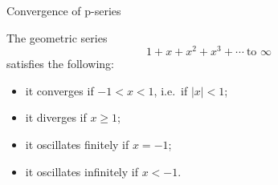 \documentclass[12pt, a4paper]{article}
\begin{document}
\clearpage

\begin{heading}
	Convergence of p-series
\end{heading}

\vspace{10pt}

\begin{theorem}
	The geometric series 
	\[
	1 + x + x^{2} + x^{3} + \cdots \ \text{to } \infty
	\]
	satisfies the following:

	\begin{itemize}
		\item it converges if $-1 < x < 1$, i.e.\ if $|x| < 1$;
		\item it diverges if $x \ge 1$;
		\item it oscillates finitely if $x = -1$;
		\item it oscillates infinitely if $x < -1$.
	\end{itemize}
\end{theorem}









\EndPage
\end{document}
